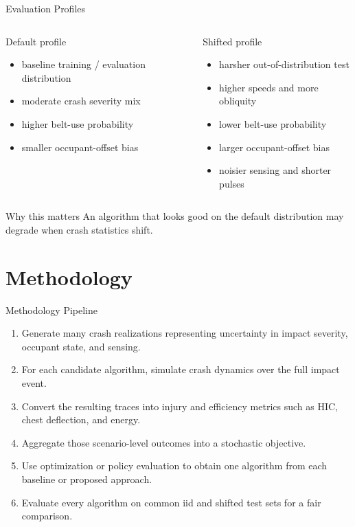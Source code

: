 \documentclass[aspectratio=169]{beamer}
\begin{document}
\begin{frame}{Evaluation Profiles}
  \begin{columns}[T]
    \begin{block}{Default profile}
      \begin{itemize}
        \item baseline training / evaluation distribution
        \item moderate crash severity mix
        \item higher belt-use probability
        \item smaller occupant-offset bias
      \end{itemize}
    \end{block}

    \begin{block}{Shifted profile}
      \begin{itemize}
        \item harsher out-of-distribution test
        \item higher speeds and more obliquity
        \item lower belt-use probability
        \item larger occupant-offset bias
        \item noisier sensing and shorter pulses
      \end{itemize}
    \end{block}
  \end{columns}

  \vspace{0.4em}
  \begin{alertblock}{Why this matters}
    An algorithm that looks good on the default distribution may degrade when crash statistics shift.
  \end{alertblock}
\end{frame}

\section{Methodology}

\begin{frame}{Methodology Pipeline}
  \begin{enumerate}
    \item Generate many crash realizations representing uncertainty in impact severity, occupant state, and sensing.
    \item For each candidate algorithm, simulate crash dynamics over the full impact event.
    \item Convert the resulting traces into injury and efficiency metrics such as HIC, chest deflection, and energy.
    \item Aggregate those scenario-level outcomes into a stochastic objective.
    \item Use optimization or policy evaluation to obtain one algorithm from each baseline or proposed approach.
    \item Evaluate every algorithm on common iid and shifted test sets for a fair comparison.
  \end{enumerate}
\end{frame}
\end{document}
